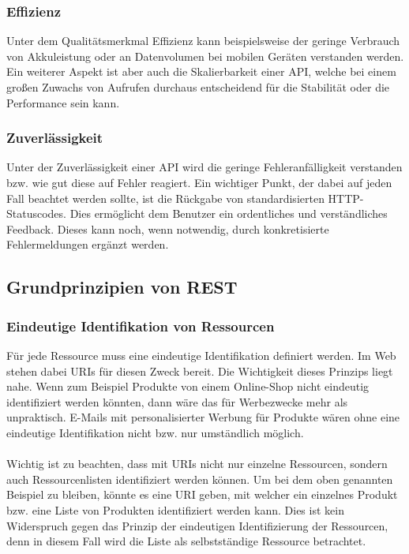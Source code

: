 \subsubsection{Effizienz}
Unter dem Qualitätsmerkmal Effizienz kann beispielsweise der geringe Verbrauch von Akkuleistung oder an Datenvolumen bei mobilen Geräten verstanden werden. Ein weiterer Aspekt ist aber auch die Skalierbarkeit einer \gls{API}, welche bei einem großen Zuwachs von Aufrufen durchaus entscheidend für die Stabilität oder die Performance sein kann.

\subsubsection{Zuverlässigkeit}
Unter der Zuverlässigkeit einer \gls{API} wird die geringe Fehleranfälligkeit verstanden bzw. wie gut diese auf Fehler reagiert. Ein wichtiger Punkt, der dabei auf jeden Fall beachtet werden sollte, ist die Rückgabe von standardisierten HTTP-Statuscodes. Dies ermöglicht dem Benutzer ein ordentliches und verständliches Feedback. Dieses kann noch, wenn notwendig, durch konkretisierte Fehlermeldungen ergänzt werden.

\subsection{Grundprinzipien von REST}\label{sec:basePrincipleREST}
\subsubsection{Eindeutige Identifikation von Ressourcen}
Für jede Ressource muss eine eindeutige Identifikation definiert werden. Im Web stehen dabei \glspl{URI} für diesen Zweck bereit. Die Wichtigkeit dieses Prinzips liegt nahe. Wenn zum Beispiel Produkte von einem Online-Shop nicht eindeutig identifiziert werden könnten, dann wäre das für Werbezwecke mehr als unpraktisch. E-Mails mit personalisierter Werbung für Produkte wären ohne eine eindeutige Identifikation nicht bzw. nur umständlich möglich.\\
\\
Wichtig ist zu beachten, dass mit \glspl{URI} nicht nur einzelne Ressourcen, sondern auch Ressourcenlisten identifiziert werden können. Um bei dem oben genannten Beispiel zu bleiben, könnte es eine \gls{URI} geben, mit welcher ein einzelnes Produkt bzw. eine Liste von Produkten identifiziert werden kann. Dies ist kein Widerspruch gegen das Prinzip der eindeutigen Identifizierung der Ressourcen, denn in diesem Fall wird die Liste als selbstständige Ressource betrachtet.

